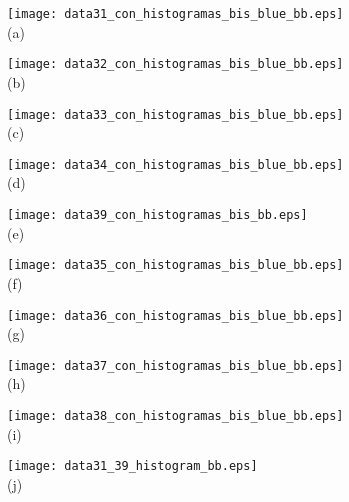 \documentclass[journal]{vgtc}                %
\begin{document}
\begin{figure*}[ht!]
    \centering

  \begin{minipage}{0.19\textwidth}
   \centering
     \texttt{[image: data31\_con\_histogramas\_bis\_blue\_bb.eps]}\\
     \footnotesize (a)
  \end{minipage}
  \hfill
  \begin{minipage}{0.19\textwidth}
   \centering
     \texttt{[image: data32\_con\_histogramas\_bis\_blue\_bb.eps]}\\
     \footnotesize (b)
  \end{minipage}
  \hfill
  \begin{minipage}{0.19\textwidth}
   \centering
     \texttt{[image: data33\_con\_histogramas\_bis\_blue\_bb.eps]}\\
     \footnotesize (c)
  \end{minipage}
  \hfill
  \begin{minipage}{0.19\textwidth}
   \centering
     \texttt{[image: data34\_con\_histogramas\_bis\_blue\_bb.eps]}\\
     \footnotesize (d)
  \end{minipage}
  \hfill
  \begin{minipage}{0.19\textwidth}
   \centering
     \texttt{[image: data39\_con\_histogramas\_bis\_bb.eps]}\\
     \footnotesize (e)
  \end{minipage}

    \mbox{} \bigskip

  \begin{minipage}{0.19\textwidth}
   \centering
     \texttt{[image: data35\_con\_histogramas\_bis\_blue\_bb.eps]}\\
     \footnotesize (f)
  \end{minipage}
  \hfill
  \begin{minipage}{0.19\textwidth}
   \centering
     \texttt{[image: data36\_con\_histogramas\_bis\_blue\_bb.eps]}\\
     \footnotesize (g)
  \end{minipage}
  \hfill
  \begin{minipage}{0.19\textwidth}
   \centering
     \texttt{[image: data37\_con\_histogramas\_bis\_blue\_bb.eps]}\\
     \footnotesize (h)
  \end{minipage}
  \hfill
  \begin{minipage}{0.19\textwidth}
   \centering
     \texttt{[image: data38\_con\_histogramas\_bis\_blue\_bb.eps]}\\
     \footnotesize (i)
  \end{minipage}
  \hfill
  \begin{minipage}{0.19\textwidth}
   \centering
     \texttt{[image: data31\_39\_histogram\_bb.eps]}\\
     \footnotesize (j)
  \end{minipage}
  

\end{figure*}
\end{document}

